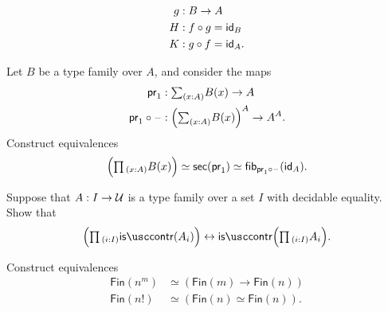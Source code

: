 \begin{exercises}
\begin{align*}
g & : B\to A \\
H & : f\circ g = \idfunc[B] \\
K & : g\circ f = \idfunc[A].
\end{align*}
\item \label{ex:pi_sec}Let $B$ be a type family over $A$, and consider the maps
  \begin{align*}
    \proj 1 & : \sm{x:A} B(x)\to A \\
    \proj1 \circ \blank & : \Big(\sm{x:A} B(x)\Big)^A \to A^A.
  \end{align*}
  Construct equivalences
  \begin{equation*}
    \Big(\prd{x:A}B(x)\Big) \eqvsym \mathsf{sec}(\proj 1) \eqvsym \fib{\proj 1 \circ\blank}{\idfunc[A]}.
  \end{equation*}
\item Suppose that $A:I\to \UU$ is a type family over a set $I$ with decidable equality. Show that
  \begin{equation*}
    \Big(\prd{i:I}\iscontr(A_i)\Big)\leftrightarrow \iscontr\Big(\prd{i:I}A_i\Big).
  \end{equation*}
\item Construct equivalences
  \begin{align*}
    \mathsf{Fin}(n^m) & \simeq (\mathsf{Fin}(m)\to\mathsf{Fin}(n)) \\
    \mathsf{Fin}(n!) & \simeq (\mathsf{Fin}(n)\simeq\mathsf{Fin}(n)).
  \end{align*}
\end{exercises}
